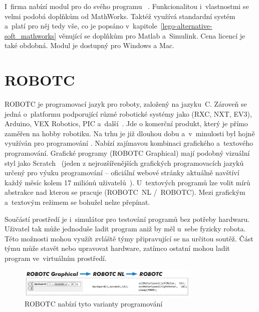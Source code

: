 I~firma \NI{} nabízí modul pro \legoM{} do svého programu \labview{}~\cite{legoProgramingPlatform_NI_LabVIEW}. 
Funkcionalitou i~vlastnostmi se velmi podobá doplňkům od MathWorks.
Taktéž využívá standardní \lego{} systém a~platí pro něj tedy vše, co je popsáno v~kapitole~\ref{lego-alternative-soft_mathworks} věnující se doplňkům pro Matlab a~Simulink. 
Cena licencí je také obdobná. Modul je dostupný pro Windows a Mac. 


\section{ROBOTC}

ROBOTC je programovací jazyk pro roboty, založený na jazyku~C. 
Zároveň se jedná o~platformu podporující různé robotické systémy jako \legoM{} (RXC, NXT, EV3), Arduino, VEX Robotics, PIC a~další~\cite{legoProgramingPlatform_ROBOTC}.
Jde o komerční produkt, který je přímo zaměřen na hobby robotiku.
Na trhu je již dlouhou dobu a~v~minulosti byl hojně využíván pro programování \legoNXT{}.
Nabízí zajímavou kombinaci grafického a~textového programování. 
Grafické programy (ROBOTC Graphical) mají podobný vizuální styl jako Scratch~\cite{scratch_oficial-about} (jeden z nejrozšířenějších grafických programovacích jazyků určený pro výuku programování -- oficiální webové stránky aktuálně navštíví každý měsíc kolem 17 miliónů uživatelů~\cite{scratch_oficial-statistic}). 
U~textových programů lze volit mírů abstrakce nad kterou se pracuje (ROBOTC~NL /~ROBOTC). 
Mezi grafickým a~textovým režimem se bohužel nelze přepínat.

Součástí prostředí je i~simulátor pro testování programů bez potřeby hardwaru. 
Uživatel tak může jednoduše ladit program aniž by měl u~sebe fyzicky robota.
Této možnosti mohou využít zvláště týmy připravující se na určitou soutěž. 
Část týmu může stavět nebo upravovat hardware, zatímco ostatní mohou ladit program ve~virtuálním prostředí. 

\begin{figure}[h]
	\centering
	\includegraphics[width=330px]{images/robotc_language-variants.png}
	\caption[ROBOTC nabízí tyto varianty programování]{ROBOTC nabízí tyto varianty programování\protect\footnotemark} %
	\label{robotc_language-variants}
\end{figure}

